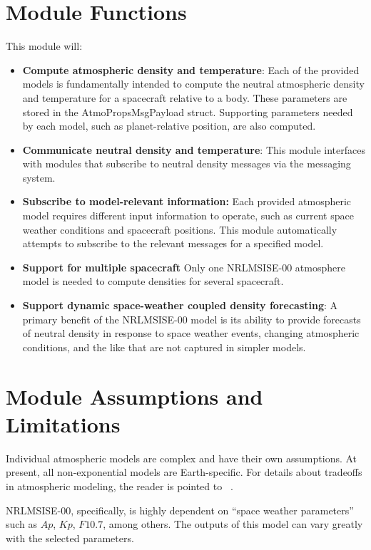 

\section{Module Functions}
This module will:
\begin{itemize}
	\item \textbf{Compute atmospheric density and temperature}: Each of the provided models is fundamentally intended to compute the neutral atmospheric density and temperature for a spacecraft relative to a body. These parameters are stored in the AtmoPropsMsgPayload struct. Supporting parameters needed by each model, such as planet-relative position, are also computed.
	\item \textbf{Communicate neutral density and temperature}: This module interfaces with modules that subscribe to neutral density messages via the messaging system.
	\item \textbf {Subscribe to model-relevant information:} Each provided atmospheric model requires different input information to operate, such as current space weather conditions and spacecraft positions. This module automatically attempts to subscribe to the relevant messages for a specified model. 
	\item \textbf{Support for multiple spacecraft} Only one NRLMSISE-00 atmosphere model is needed to compute densities for several spacecraft.
	\item \textbf{Support dynamic space-weather coupled density forecasting}: A primary benefit of the NRLMSISE-00 model is its ability to provide forecasts of neutral density in response to space weather events, changing atmospheric conditions, and the like that are not captured in simpler models.
\end{itemize}

\section{Module Assumptions and Limitations}
Individual atmospheric models are complex and have their own assumptions. At present, all non-exponential models are Earth-specific. For details about tradeoffs in atmospheric modeling, the reader is pointed to ~. 

NRLMSISE-00, specifically, is highly dependent on ``space weather parameters'' such as $Ap$, $Kp$, $F10.7$, among others. The outputs of this model can vary greatly with the selected parameters.